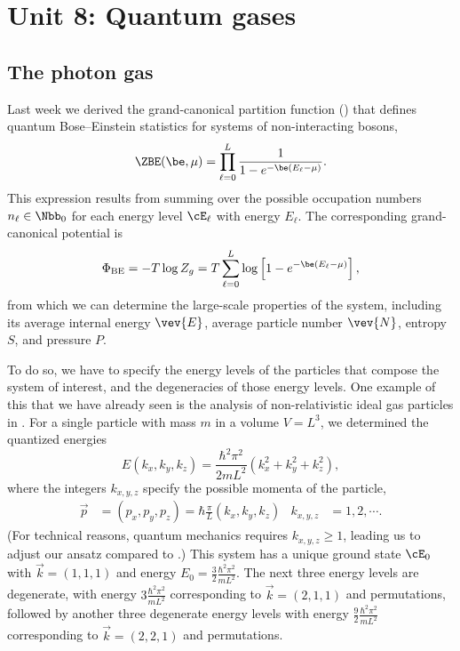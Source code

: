 \renewcommand{\thisunit}{MATH327 Unit 8}
\renewcommand{\moddate}{Last modified 17 Jan.~2022}
\setcounter{section}{8}
\setcounter{subsection}{0}
{}
\section*{Unit 8: Quantum gases}
\subsection{The photon gas}
Last week we derived the grand-canonical partition function () that defines quantum Bose--Einstein statistics for systems of non-interacting bosons,
\begin{equation*}
  \ZBE(\be, \mu) = \prod_{\ell = 0}^L \frac{1}{1 - e^{-\be (E_{\ell} - \mu)}}.
\end{equation*}
This expression results from summing over the possible occupation numbers $n_{\ell} \in \Nbb_0$ for each energy level $\cE_{\ell}$ with energy $E_{\ell}$.
The corresponding grand-canonical potential is
\begin{equation*}
  \Phi_{\text{BE}} = -T \log Z_g = T \sum_{\ell = 0}^L \log\left[1 - e^{-\be (E_{\ell} - \mu)}\right],
\end{equation*}
from which we can determine the large-scale properties of the system, including its average internal energy $\vev{E}$, average particle number $\vev{N}$, entropy $S$, and pressure $P$.

To do so, we have to specify the energy levels of the particles that compose the system of interest, and the degeneracies of those energy levels.
One example of this that we have already seen is the analysis of non-relativistic ideal gas particles in .
For a single particle with mass $m$ in a volume $V = L^3$, we determined the quantized energies
\begin{equation}
  \label{eq:nonrel_energy}
  E(k_x, k_y, k_z) = \frac{\hbar^2 \pi^2}{2mL^2}\left(k_x^2 + k_y^2 + k_z^2\right),
\end{equation}
where the integers $k_{x, y, z}$ specify the possible momenta of the particle,
\begin{align*}
  \vec p & = (p_x, p_y, p_z) = \hbar \frac{\pi}{L} (k_x, k_y, k_z) &
  k_{x, y, z} & = 1, 2, \cdots.
\end{align*}
(For technical reasons, quantum mechanics requires $k_{x, y, z} \geq 1$, leading us to adjust our ansatz compared to .)
This system has a unique ground state $\cE_0$ with $\vec k = (1, 1, 1)$ and energy $E_0 = \frac{3}{2} \frac{\hbar^2 \pi^2}{mL^2}$.
The next three energy levels are degenerate, with energy $3 \frac{\hbar^2 \pi^2}{mL^2}$ corresponding to $\vec k = (2, 1, 1)$ and permutations, followed by another three degenerate energy levels with energy $\frac{9}{2} \frac{\hbar^2 \pi^2}{mL^2}$ corresponding to $\vec k = (2, 2, 1)$ and permutations.

